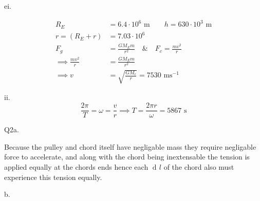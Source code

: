 \documentclass[12pt]{article}
\DeclareMathOperator{\di}{d\!}
\begin{document}
    ei.

    \begin{equation*}
        \begin{split}
            R_E&=6.4\cdot10^6\text{ m}\qquad h=630\cdot10^3\text{ m}\\
            r=(R_E+r)&=7.03\cdot10^6\\
            F_g&=\frac{GM_Em}{r^2}\quad\&\quad F_c=\frac{mv^2}{r}\\
            \implies\frac{mv^2}{r}&=\frac{GM_Em}{r^2}\\
            \implies v&=\sqrt{\frac{GM_e}{r}}=7530\text{ ms$^{-1}$}
        \end{split}
    \end{equation*}

    ii.
    \begin{equation*}
        \frac{2\pi}{T}=\omega=\frac{v}{r}\implies T=\frac{2\pi r}{\omega}=5867\text{ s}
    \end{equation*}

    Q2a.

    Because the pulley and chord itself have negligable mass they require negligable force to accelerate, and along with the chord being inextensable the tension is applied equally at the chords ends hence each $\di l$ of the chord also must experience this tension equally.  

    b.
\end{document}
